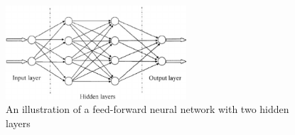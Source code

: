 \begin{figure}
\centering
\includegraphics[width=0.6\textwidth]{img/Fig-1-Schematic-diagram-of-a-multilayer-feed-forward-neural-network-3.png}
\caption[]{\label{fig:feed_forward} An illustration of a feed-forward neural network with two hidden layers \cite{Griffiths2015IntroductionAnalysis}} 
\end{figure}